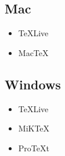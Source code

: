 \documentclass[hidelinks, float=false, crop=false]{standalone}
\begin{document}
        \subsection{Mac}
            \begin{itemize}
                \item TeXLive
                \item MacTeX
            \end{itemize}
        \subsection{Windows}
            \begin{itemize}
                \item TeXLive
                \item MiKTeX
                \item ProTeXt
            \end{itemize}

    \clearpage
    \standaloneBib
\end{document}

